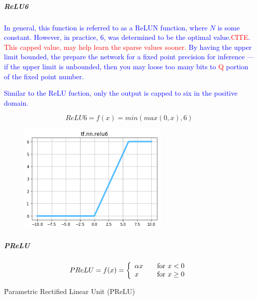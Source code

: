 \subparagraph{ReLU6}

\textcolor{blue}{In general, this function is referred to as a {ReLUN} function, where $N$ is some constant. However, in practice, $6$, was determined to be the optimal value.\textcolor{red}{CITE}. \textcolor{red}{This capped value, may help learn the sparse values sooner.} By having the upper limit bounded, the prepare the network for a fixed point precision for inference --- if the upper limit is unbounded, then you may loose too many bits to \textcolor{red}{Q} portion of the fixed point number.}


\textcolor{blue}{Similar to the ReLU fuction, only the output is capped to six in the positive domain.}

\begin{equation}
{
	ReLU6 = f(x) = min{(max{(0,x)},6)}
}
\label{eq:act_ReLU6_def}
\end{equation}

\begin{figure}
	\centering
	\includegraphics[width=0.65\textwidth]{./sync_imgs/act/notsmooth/relu6.png}
	\label{fig:act_notsmooth_relu6}
\end{figure}

\subparagraph{PReLU}

\begin{equ}[!ht]
	\begin{equation}
	{
		PReLU = f(x) = \left\{
		\begin{array}{ll}
		\alpha x & \quad $for$ \ x < 0 \\
		x & \quad $for$ \ x \ge 0
		\end{array}
		\right.
	}
	\label{eq:act_prelu_def}
	\end{equation}
	\caption{where $\alpha$ is a parameterized --- a learned parameter from training.}
\end{equ}

\r{Parametric Rectified Linear Unit (PReLU) \cite{he2015delving}}

